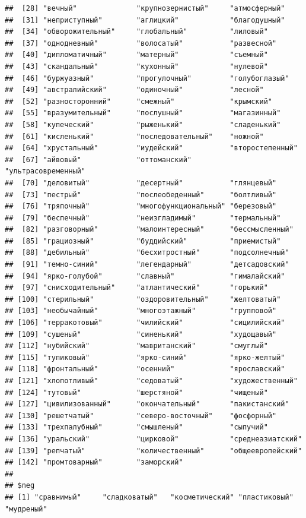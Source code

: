 \documentclass[11pt]{article}\usepackage[]{graphicx}\usepackage[]{color}
\makeatletter
\newenvironment{kframe}{%
 \def\at@end@of@kframe{}%
 \ifinner\ifhmode%
  \def\at@end@of@kframe{\end{minipage}}%
  \begin{minipage}{\columnwidth}%
 \fi\fi%
 \def\FrameCommand##1{\hskip\@totalleftmargin \hskip-\fboxsep
 \colorbox{shadecolor}{##1}\hskip-\fboxsep
     \hskip-\linewidth \hskip-\@totalleftmargin \hskip\columnwidth}%
 \MakeFramed {\advance\hsize-\width
   \@totalleftmargin\z@ \linewidth\hsize
   \@setminipage}}%
 {\par\unskip\endMakeFramed%
 \at@end@of@kframe}
\newenvironment{knitrout}{}{} %
\makeatother
\begin{document}
\begin{knitrout}
\begin{kframe}
\begin{verbatim}
##  [28] "вечный"              "крупнозернистый"     "атмосферный"        
##  [31] "неприступный"        "аглицкий"            "благодушный"        
##  [34] "обворожительный"     "глобальный"          "лиловый"            
##  [37] "однодневный"         "волосатый"           "развесной"          
##  [40] "дипломатичный"       "матерный"            "съемный"            
##  [43] "скандальный"         "кухонный"            "нулевой"            
##  [46] "буржуазный"          "прогулочный"         "голубоглазый"       
##  [49] "австралийский"       "одиночный"           "лесной"             
##  [52] "разносторонний"      "смежный"             "крымский"           
##  [55] "вразумительный"      "послушный"           "магазинный"         
##  [58] "купеческий"          "рыженький"           "сладенький"         
##  [61] "кисленький"          "последовательный"    "ножной"             
##  [64] "хрустальный"         "иудейский"           "второстепенный"     
##  [67] "айвовый"             "оттоманский"         "ультрасовременный"  
##  [70] "деловитый"           "десертный"           "глянцевый"          
##  [73] "пестрый"             "послеобеденный"      "болтливый"          
##  [76] "тряпочный"           "многофункциональный" "березовый"          
##  [79] "беспечный"           "неизгладимый"        "термальный"         
##  [82] "разговорный"         "малоинтересный"      "бессмысленный"      
##  [85] "грациозный"          "буддийский"          "приемистый"         
##  [88] "дебильный"           "бесхитростный"       "подсолнечный"       
##  [91] "темно-синий"         "легендарный"         "детсадовский"       
##  [94] "ярко-голубой"        "славный"             "гималайский"        
##  [97] "снисходительный"     "атлантический"       "горький"            
## [100] "стерильный"          "оздоровительный"     "желтоватый"         
## [103] "необычайный"         "многоэтажный"        "групповой"          
## [106] "терракотовый"        "чилийский"           "сицилийский"        
## [109] "сушеный"             "синенький"           "худощавый"          
## [112] "нубийский"           "мавританский"        "смуглый"            
## [115] "тупиковый"           "ярко-синий"          "ярко-желтый"        
## [118] "фронтальный"         "осенний"             "ярославский"        
## [121] "хлопотливый"         "седоватый"           "художественный"     
## [124] "тутовый"             "шерстяной"           "чищеный"            
## [127] "цивилизованный"      "окончательный"       "пакистанский"       
## [130] "решетчатый"          "северо-восточный"    "фосфорный"          
## [133] "трехпалубный"        "смышленый"           "сыпучий"            
## [136] "уральский"           "цирковой"            "среднеазиатский"    
## [139] "репчатый"            "количественный"      "общеевропейский"    
## [142] "промтоварный"        "заморский"          
## 
## $neg
## [1] "сравнимый"     "сладковатый"   "косметический" "пластиковый"   "мудреный"
\end{verbatim}
\end{kframe}
\end{knitrout}
\end{document}
